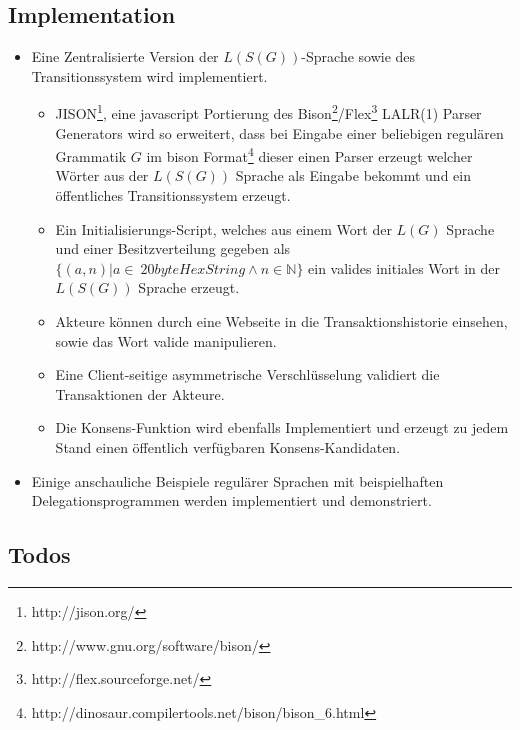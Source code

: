 \documentclass[]{article}
\begin{document}
\subsection*{Implementation}
\begin{itemize}
  \item Eine Zentralisierte Version der $L(S(G))$-Sprache sowie des Transitionssystem wird implementiert.
  \begin{itemize}
    \item JISON\footnote{http://jison.org/}, eine javascript Portierung des Bison\footnote{http://www.gnu.org/software/bison/}/Flex\footnote{http://flex.sourceforge.net/} LALR(1) Parser Generators wird so erweitert, dass bei Eingabe einer beliebigen regulären Grammatik $G$ im bison Format\footnote{http://dinosaur.compilertools.net/bison/bison\_6.html} dieser einen Parser erzeugt welcher Wörter aus der $L(S(G))$ Sprache als Eingabe bekommt und ein öffentliches Transitionssystem erzeugt.
    \item Ein Initialisierungs-Script, welches aus einem Wort der $L(G)$ Sprache und einer Besitzverteilung gegeben als $\{(a,n)| a\in\ 20byteHexString \land n\in \mathbb{N} \}$ ein valides initiales Wort in der $L(S(G))$ Sprache erzeugt.
    \item Akteure können durch eine Webseite in die Transaktionshistorie einsehen, sowie das Wort valide manipulieren.
    \item Eine Client-seitige asymmetrische Verschlüsselung validiert die Transaktionen der Akteure.
    \item Die Konsens-Funktion wird ebenfalls Implementiert und erzeugt zu jedem Stand einen öffentlich verfügbaren Konsens-Kandidaten.
  \end{itemize}
  \item Einige anschauliche Beispiele regulärer Sprachen mit beispielhaften Delegationsprogrammen werden implementiert und demonstriert.
\end{itemize}

\subsection*{Todos}

\listoftodos[Aufgaben]



\end{document}
